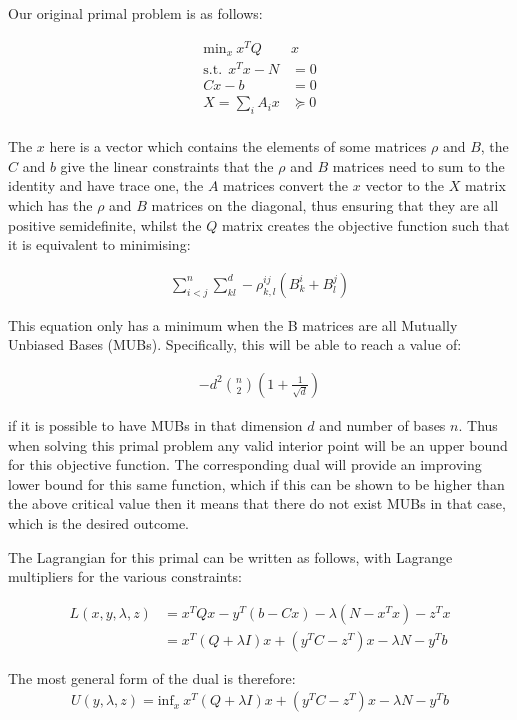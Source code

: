 \documentclass{article}
\begin{document}
Our original primal problem is as follows:

\begin{align}
	\text{min}_{x} ~ x^T Q &x \\
	\text{s.t.} ~~ x^T x - N &= 0 \\
	Cx - b &= 0 \\
	X = \sum_i A_i x &\succeq 0 \\
\end{align}

The $x$ here is a vector which contains the elements of some matrices $\rho$ and $B$, the $C$ and $b$ give the linear constraints that the $\rho$ and $B$ matrices need to sum to the identity and have trace one, the $A$ matrices convert the $x$ vector to the $X$ matrix which has the $\rho$ and $B$ matrices on the diagonal, thus ensuring that they are all positive semidefinite, whilst the $Q$ matrix creates the objective function such that it is equivalent to minimising:

\begin{align}
	\sum_{i<j}^n \sum_{kl}^d -\rho_{k,l}^{ij} (B_k^i + B_l^j)
\end{align}

This equation only has a minimum when the B matrices are all Mutually Unbiased Bases (MUBs). Specifically, this will be able to reach a value of:

\begin{align}
	-d^2 \binom{n}{2} \left(1+\frac{1}{\sqrt{d}}\right)
\end{align}

if it is possible to have MUBs in that dimension $d$ and number of bases $n$.  Thus when solving this primal problem any valid interior point will be an upper bound for this objective function. The corresponding dual will provide an improving lower bound for this same function, which if this can be shown to be higher than the above critical value then it means that there do not exist MUBs in that case, which is the desired outcome.

The Lagrangian for this primal can be written as follows, with Lagrange multipliers for the various constraints:

\begin{align}
	L(x, y, \lambda, z) &= x^T Q x - y^T (b-Cx) - \lambda (N - x^T x) - z^T x \\ 
						&= x^T ( Q + \lambda I) x + (y^TC - z^T) x - \lambda N - y^T b
\end{align}

The most general form of the dual is therefore:
\begin{align}
	U(y, \lambda, z) = \text{inf}_{x} ~  x^T ( Q + \lambda I) x + (y^TC - z^T) x - \lambda N - y^T b
\end{align}
\end{document}
